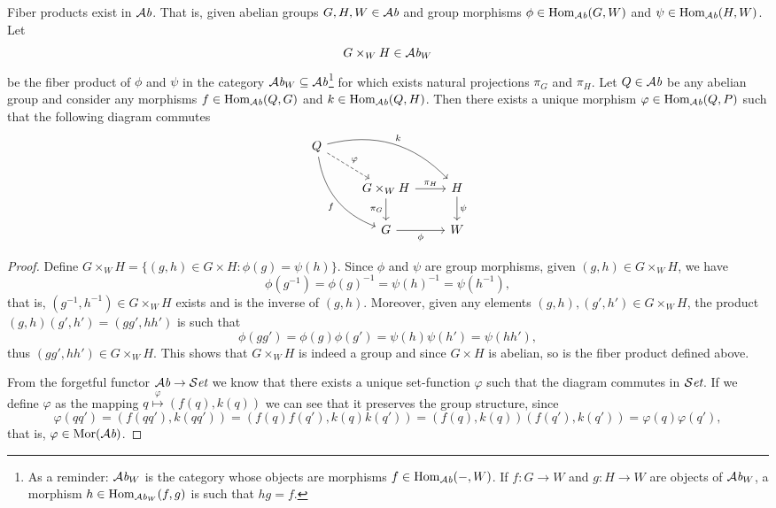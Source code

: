 \begin{proposition}
  Fiber products exist in \({\mathcal{A}\textit{b}}\). That is, given abelian groups \(G, H, W \in
  {\mathcal{A}\textit{b}}\) and group morphisms \(\phi \in \operatorname{Hom}_{\mathcal{A}\textit{b}}(G, W)\) and \(\psi \in
  \operatorname{Hom}_{\mathcal{A}\textit{b}}(H, W)\). Let
  \[
    G \times_W H \in {\mathcal{A}\textit{b}}_W
  \]
  be the fiber product of \(\phi\) and \(\psi\) in the category \({\mathcal{A}\textit{b}}_W
  \subseteq {\mathcal{A}\textit{b}}\)\footnote{As a reminder: \({\mathcal{A}\textit{b}}_W\) is the category whose
  objects are morphisms \(f \in \operatorname{Hom}_{\mathcal{A}\textit{b}}(-, W)\). If \(f: G \to W\) and \(g: H
  \to W\) are objects of \({\mathcal{A}\textit{b}}_W\), a morphism \(h \in \operatorname{Hom}_{{\mathcal{A}\textit{b}}_W}(f, g)\) is
  such that \(hg = f\).} for which exists natural projections \(\pi_G\) and
  \(\pi_H\). Let \(Q \in {\mathcal{A}\textit{b}}\) be any abelian group and consider any morphisms \(f \in
  \operatorname{Hom}_{\mathcal{A}\textit{b}}(Q, G)\) and \(k \in \operatorname{Hom}_{\mathcal{A}\textit{b}}(Q, H)\). Then there exists a unique
  morphism \(\varphi \in \operatorname{Hom}_{\mathcal{A}\textit{b}}(Q, P)\) such that the following diagram commutes
  \[
    \begin{tikzcd}
      Q \ar[dr, dashed, "\varphi"] \ar[ddr, bend right, swap, "f"]
      \ar[drr, bend left, "k"]
      & & \\
      &G \times_W H \ar[r, "\pi_H"] \ar[d, swap, "\pi_G"] &H \ar[d, "\psi"] \\
      &G \ar[r, swap, "\phi"] &W
    \end{tikzcd}
  \]
\end{proposition}

\begin{proof}
  Define \(G \times_W H = \{(g, h) \in G \times H : \phi(g) = \psi(h)\}\). Since
  \(\phi\) and \(\psi\) are group morphisms, given \((g, h) \in G \times_W H\),
  we have
  \[
    \phi(g^{-1}) = \phi(g)^{-1} = \psi(h)^{-1} = \psi(h^{-1}),
  \]
  that is, \((g^{-1}, h^{-1}) \in G \times_W H\) exists and is the inverse of
  \((g, h)\). Moreover, given any elements \((g, h), (g', h') \in G \times_W H\), the
  product \((g, h)(g', h') = (gg', hh')\) is such that
  \[
    \phi(gg') = \phi(g) \phi(g') = \psi(h) \psi(h') = \psi(hh'),
  \]
  thus \((gg', hh') \in G \times_W H\). This shows that \(G \times_W H\) is
  indeed a group and since \(G \times H\) is abelian, so is the fiber product
  defined above.

  From the forgetful functor \({\mathcal{A}\textit{b}} \to {\mathcal{S}\textit{et}}\) we know that there exists a unique
  set-function \(\varphi\) such that the diagram commutes in \({\mathcal{S}\textit{et}}\). If we
  define \(\varphi\) as the mapping \(q \overset \varphi \longmapsto (f(q),
  k(q))\) we can see that it preserves the group structure, since
  \[
    \varphi(qq') = (f(qq'), k(qq')) = (f(q)f(q'), k(q)k(q'))
    = (f(q), k(q))(f(q'), k(q')) = \varphi(q) \varphi(q'),
  \]
  that is, \(\varphi \in \operatorname{Mor}({\mathcal{A}\textit{b}})\).
\end{proof}

